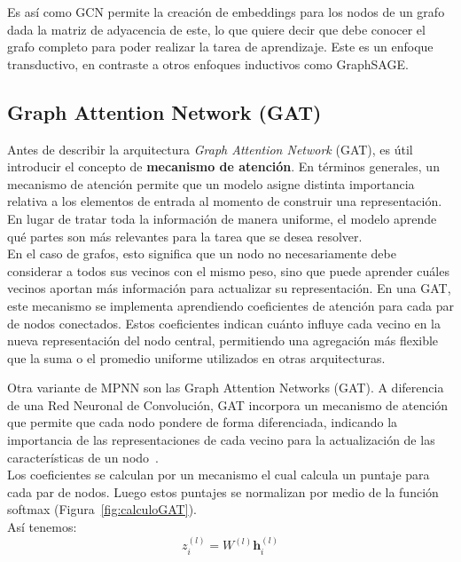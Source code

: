 Es así como GCN permite la creación de embeddings para los nodos de un grafo dada la matriz de adyacencia de este, lo que quiere decir que debe conocer el grafo completo para poder realizar la tarea de aprendizaje. Este es un enfoque transductivo, en contraste a otros enfoques inductivos como GraphSAGE.\\

\subsection{Graph Attention Network (GAT)}

Antes de describir la arquitectura \textit{Graph Attention Network} (GAT), es útil introducir el concepto de \textbf{mecanismo de atención}. En términos generales, un mecanismo de atención permite que un modelo asigne distinta importancia relativa a los elementos de entrada al momento de construir una representación. En lugar de tratar toda la información de manera uniforme, el modelo aprende qué partes son más relevantes para la tarea que se desea resolver.\\

En el caso de grafos, esto significa que un nodo no necesariamente debe considerar a todos sus vecinos con el mismo peso, sino que puede aprender cuáles vecinos aportan más información para actualizar su representación. En una GAT, este mecanismo se implementa aprendiendo coeficientes de atención para cada par de nodos conectados. Estos coeficientes indican cuánto influye cada vecino en la nueva representación del nodo central, permitiendo una agregación más flexible que la suma o el promedio uniforme utilizados en otras arquitecturas.

Otra variante de MPNN son las Graph Attention Networks (GAT). A diferencia de una Red Neuronal de Convolución, GAT incorpora un mecanismo de atención que permite que cada nodo pondere de forma diferenciada, indicando la importancia de las representaciones de cada vecino para la actualización de las características de un nodo~\cite{GAT}.\\

Los coeficientes se calculan por un mecanismo el cual calcula un puntaje para cada par de nodos. Luego estos puntajes se normalizan por medio de la función softmax (Figura~\ref{fig:calculoGAT}).\\

Así tenemos:\\


\begin{equation}
   z^{(l)}_{i} = W^{(l)} \mathbf{h}^{(l)}_i
   \label{ecu:paso-1-gat}
\end{equation}


